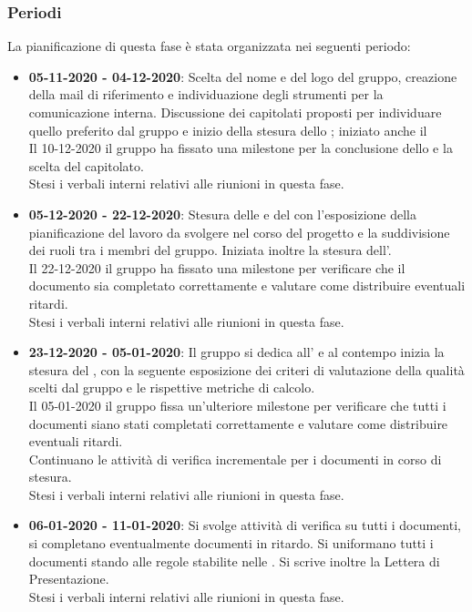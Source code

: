 \subsubsection{Periodi}
La pianificazione di questa fase è stata organizzata nei seguenti periodo:
\begin{itemize}
\item \textbf{05-11-2020 - 04-12-2020}: Scelta del nome e del logo del gruppo, creazione della mail di riferimento e individuazione degli strumenti per la comunicazione interna. Discussione dei capitolati proposti per individuare quello preferito dal gruppo e inizio della stesura dello \SdF{} ; iniziato anche il \Glossario \\Il 10-12-2020 il gruppo ha fissato una milestone\glo{} per la conclusione dello \SdF{} e la scelta del capitolato.\\Stesi i verbali interni relativi alle riunioni in questa fase.
\item \textbf{05-12-2020 - 22-12-2020}: Stesura delle \NdP{} e del \PdP{} con l'esposizione della pianificazione del lavoro da svolgere nel corso del progetto e la suddivisione dei ruoli tra i membri del gruppo. Iniziata inoltre la stesura dell'\AdR{}.\\Il 22-12-2020 il gruppo ha fissato una milestone per verificare che il documento \NdP{} sia completato correttamente e valutare come distribuire eventuali ritardi.\\Stesi i verbali interni relativi alle riunioni in questa fase.
\item \textbf{23-12-2020 - 05-01-2020}: Il gruppo si dedica all'\AdR{} e al contempo inizia la stesura del \PdQ{}, con la seguente esposizione dei criteri di valutazione della qualità scelti dal gruppo e le rispettive metriche\glo{} di calcolo.\\Il 05-01-2020 il gruppo fissa un'ulteriore milestone per verificare che tutti i documenti siano stati completati correttamente e valutare come distribuire eventuali ritardi.\\Continuano le attività di verifica incrementale per i documenti in corso di stesura.\\Stesi i verbali interni relativi alle riunioni in questa fase.
\item \textbf{06-01-2020 - 11-01-2020}: Si svolge attività di verifica su tutti i documenti, si completano eventualmente documenti in ritardo. Si uniformano tutti i documenti stando alle regole stabilite nelle \NdP{}. Si scrive inoltre la Lettera di Presentazione.\\Stesi i verbali interni relativi alle riunioni in questa fase.
\end{itemize}
